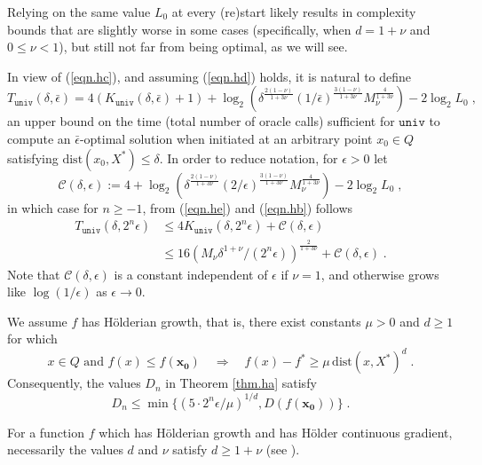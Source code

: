 \documentclass[reqno, 11pt]{amsart}
\numberwithin{equation}{section}
\newcommand{\univ}{\mathtt{univ}}
\newcommand{\dist}{\mathrm{dist}}
\begin{document}
Relying on the same value $ L_0 $ at every (re)start likely results in complexity bounds that are slightly worse in some cases (specifically, when $ d = 1 + \nu $ and $ 0 \leq \nu < 1 $), but still not far from being optimal, as we will see.

In view of (\ref{eqn.hc}), and assuming (\ref{eqn.hd}) holds, it is natural to define
\begin{equation}  \label{eqn.he}
  T_{\univ}(\delta, \bar{\epsilon} ) = 4( K_{\univ}( \delta, \bar{\epsilon} ) + 1) + \log_2 \left( \delta^{\frac{2(1 - \nu)}{1 + 3 \nu}} (1/ \bar{\epsilon} )^{\frac{3(1-\nu)}{1 + 3 \nu}} M_{\nu}^{ \frac{4}{1 + 3 \nu}} \right) - 2 \log_2 L_0\; ,
\end{equation}  
an upper bound on the time (total number of oracle calls) sufficient for $ \univ $ to compute an $ \bar{\epsilon} $-optimal solution when initiated at an arbitrary point $ x_0 \in Q $ satisfying $ \dist(x_0, X^*)\leq\delta $.    In order to reduce notation, for $ \epsilon > 0 $ let
\[  
     {\mathcal C} (\delta, \epsilon) :=  4 + \log_2 \left( \delta^{\frac{2(1 - \nu)}{1 + 3 \nu}} (2/ \epsilon   )^{\frac{3(1-\nu)}{1 + 3 \nu}} M_{\nu}^{ \frac{4}{1 + 3 \nu}} \right) - 2 \log_2 L_0 \; , 
\] 
in which case for $ n \geq -1 $, from (\ref{eqn.he})  and (\ref{eqn.hb})  follows
\begin{align}  
 T_{\univ}(\delta, 2^n \epsilon ) & \leq 4   K_{\univ}( \delta, 2^n \epsilon ) + {\mathcal C} (\delta, \epsilon) \nonumber \\
&  \leq 16  \left( M_{\nu} \delta^{1 + \nu}/ (2^n \epsilon)  \right)^{\frac{2}{1 + 3 \nu}} + {\mathcal C} (\delta, \epsilon) \; . \label{eqn.hf} 
\end{align}
Note that $ {\mathcal C} (\delta, \epsilon) $ is a constant independent of $ \epsilon $ if $ \nu = 1 $, and otherwise grows like $ \log(1/\epsilon) $ as $ \epsilon \rightarrow 0 $.


We assume $ f $ has H\"{o}lderian growth, that is, there exist constants $ \mu > 0 $ and $ d \geq 1 $ for which
\[ 
   x \in Q \textrm{ and } f(x) \leq f( \mathbf{x_0})  \quad \Rightarrow \quad f(x) - f^* \geq \mu \,  \dist(x,X^*)^d \; . 
\] 
Consequently, the values $ D_n $ in Theorem \ref{thm.ha}  satisfy
\begin{equation}  \label{eqn.hg} 
               D_n \leq \min \{ (5 \cdot 2^n \epsilon/\mu)^{1/d}, D(f( \mathbf{x_0})) \} \; .  
\end{equation}
  
For a function $ f $ which has H\"{o}lderian growth and has H\"{o}lder continuous gradient, necessarily the values $ d $ and $ \nu $ satisfy $ d \geq 1 + \nu $ (see \cite[\S1.3]{roulet2017sharpness}).
\end{document}
